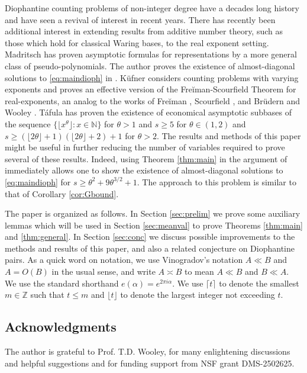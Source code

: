 \documentclass[11pt,reqno]{amsart}
\numberwithin{equation}{section}
\begin{document}
Diophantine counting problems of non-integer degree have a decades long history and have seen a revival of interest in recent years. There has recently been additional interest in extending results from additive number theory, such as those which hold for classical Waring bases, to the real exponent setting. Madritsch \cite{mad26} has proven asymptotic formulas for representations by a more general class of pseudo-polynomials. The author proves the existence of almost-diagonal solutions to \eqref{eq:maindioph} in \cite{Bhargava2}. K\"{u}fner \cite{Kuf} considers counting problems with varying exponents and proves an effective version of the Fre\u iman-Scourfield Theorem for real-exponents, an analog to the works of Fre\u iman \cite{Freiman}, Scourfield \cite{Scour}, and Br\"{u}dern and Wooley \cite{BWFrei}. T\'{a}fula \cite{taf26} has proven the existence of economical asymptotic subbases of the sequence $\{ \lfloor x^{\theta} \rfloor: x \in \mathbb{N} \}$ for $\theta > 1$ and $s \geq 5$ for $\theta \in (1,2)$ and $s \geq (\lfloor 2\theta \rfloor+1)(\lfloor 2\theta \rfloor +2)+1$ for $\theta > 2$. The results and methods of this paper might be useful in further reducing the number of variables required to prove several of these results. Indeed, using Theorem \ref{thm:main} in the argument of \cite{Bhargava2} immediately allows one to show the existence of almost-diagonal solutions to \eqref{eq:maindioph} for $s \geq \theta^2 +9\theta^{3/2}+1$. The approach to this problem is similar to that of Corollary \ref{cor:Gbound}. 

The paper is organized as follows. In Section \ref{sec:prelim} we prove some auxiliary lemmas which will be used in Section \ref{sec:meanval} to prove Theorems \ref{thm:main} and \ref{thm:general}. In Section \ref{sec:conc} we discuss possible improvements to the methods and results of this paper, and also a related conjecture on Diophantine pairs. As a quick word on notation, we use Vinogradov's notation $A \ll B$ and $A = O(B)$ in the usual sense, and write $A \asymp B$ to mean $A \ll B$ and $B \ll A$. We use the standard shorthand $e(\alpha) = e^{2\pi i \alpha}$. We use $\lceil t \rceil $ to denote the smallest $m \in \mathbb{Z}$ such that $t \leq m$ and $\lfloor t \rfloor$ to denote the largest integer not exceeding $t$.


\subsection{Acknowledgments} The author is grateful to Prof. T.D. Wooley, for many enlightening discussions and helpful suggestions and for funding support from NSF grant DMS-2502625. 
\end{document}
